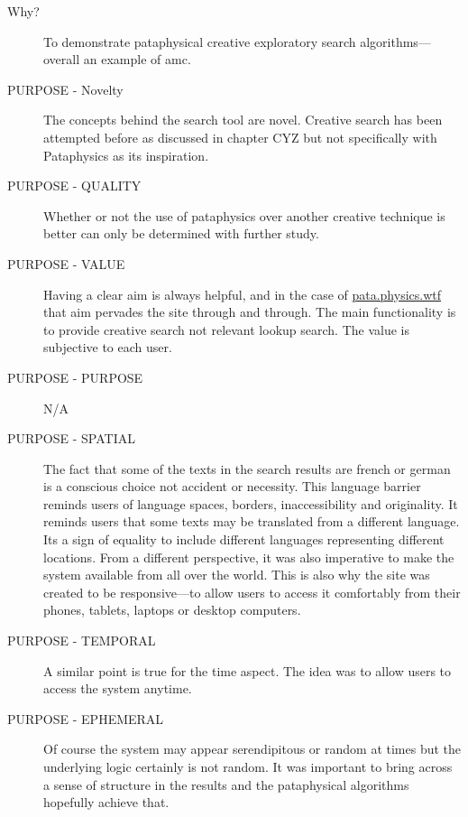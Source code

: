 \spirals

\begin{description}
  \item[Why?] To demonstrate pataphysical creative exploratory search algorithms---overall an example of \gls{amc}.
  \item[PURPOSE - Novelty] The concepts behind the search tool are novel. Creative search has been attempted before as discussed in chapter CYZ but not specifically with Pataphysics as its inspiration.
  \item[PURPOSE - QUALITY] Whether or not the use of pataphysics over another creative technique is better can only be determined with further study.
  \item[PURPOSE - VALUE] Having a clear aim is always helpful, and in the case of \url{pata.physics.wtf} that aim pervades the site through and through. The main functionality is to provide creative search not relevant lookup search. The value is subjective to each user.
  \item[PURPOSE - PURPOSE] N/A
  \item[PURPOSE - SPATIAL] The fact that some of the texts in the search results are french or german is a conscious choice not accident or necessity. This language barrier reminds users of language spaces, borders, inaccessibility and originality. It reminds users that some texts may be translated from a different language. Its a sign of equality to include different languages representing different locations. From a different perspective, it was also imperative to make the system available from all over the world. This is also why the site was created to be responsive---to allow users to access it comfortably from their phones, tablets, laptops or desktop computers.
  \item[PURPOSE - TEMPORAL] A similar point is true for the time aspect. The idea was to allow users to access the system anytime.
  \item[PURPOSE - EPHEMERAL] Of course the system may appear serendipitous or random at times but the underlying logic certainly is not random. It was important to bring across a sense of structure in the results and the pataphysical algorithms hopefully achieve that.
\end{description}

\spirals

